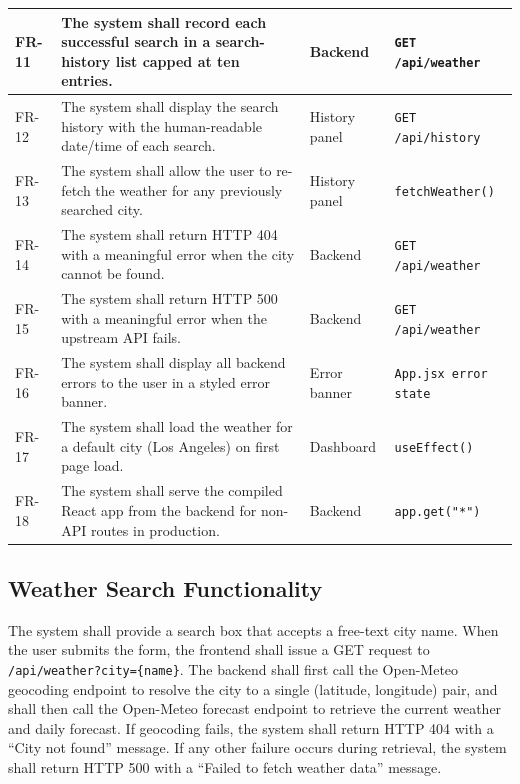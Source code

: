\documentclass[11pt,letterpaper]{article}
\begin{document}
\begin{longtable}{| C{0.55in} | L{2.9in} | L{1in} | L{1.3in} |}
FR-11 & The system shall record each successful search in a search-history list capped at ten entries. & Backend & \texttt{\footnotesize GET /api/weather} \\ \hline
{}FR-12 & The system shall display the search history with the human-readable date/time of each search. & History panel & \texttt{\footnotesize GET /api/history} \\ \hline
FR-13 & The system shall allow the user to re-fetch the weather for any previously searched city. & History panel & \texttt{\footnotesize fetchWeather()} \\ \hline
{}FR-14 & The system shall return HTTP 404 with a meaningful error when the city cannot be found. & Backend & \texttt{\footnotesize GET /api/weather} \\ \hline
FR-15 & The system shall return HTTP 500 with a meaningful error when the upstream API fails. & Backend & \texttt{\footnotesize GET /api/weather} \\ \hline
{}FR-16 & The system shall display all backend errors to the user in a styled error banner. & Error banner & \texttt{\footnotesize App.jsx error state} \\ \hline
FR-17 & The system shall load the weather for a default city (Los Angeles) on first page load. & Dashboard & \texttt{\footnotesize useEffect()} \\ \hline
{}FR-18 & The system shall serve the compiled React app from the backend for non-API routes in production. & Backend & \texttt{\footnotesize app.get("*")} \\ \hline
\end{longtable}

\subsection{Weather Search Functionality}
The system shall provide a search box that accepts a free-text city name. When the user submits the form, the frontend shall issue a GET request to \texttt{/api/weather?city=\{name\}}. The backend shall first call the Open-Meteo geocoding endpoint to resolve the city to a single (latitude, longitude) pair, and shall then call the Open-Meteo forecast endpoint to retrieve the current weather and daily forecast. If geocoding fails, the system shall return HTTP 404 with a ``City not found'' message. If any other failure occurs during retrieval, the system shall return HTTP 500 with a ``Failed to fetch weather data'' message.
\end{document}
